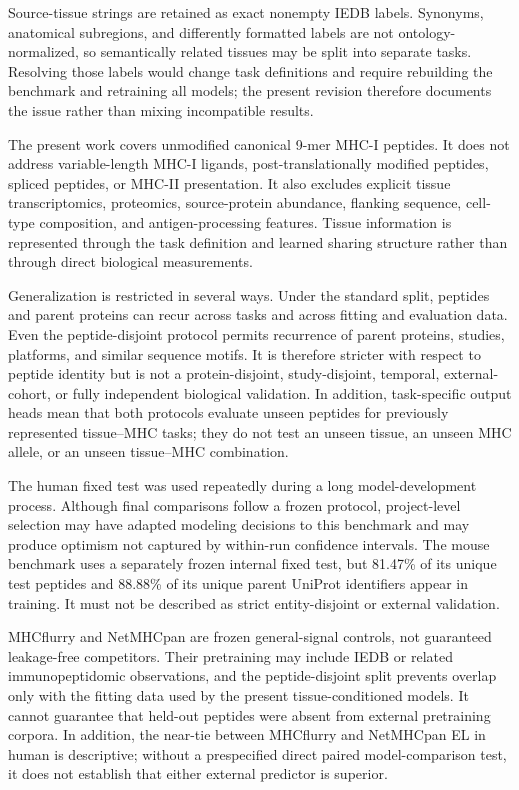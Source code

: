 Source-tissue strings are retained as exact nonempty IEDB labels. Synonyms, anatomical subregions, and differently formatted labels are not ontology-normalized, so semantically related tissues may be split into separate tasks. Resolving those labels would change task definitions and require rebuilding the benchmark and retraining all models; the present revision therefore documents the issue rather than mixing incompatible results.

The present work covers unmodified canonical 9-mer MHC-I peptides. It does not address variable-length MHC-I ligands, post-translationally modified peptides, spliced peptides, or MHC-II presentation. It also excludes explicit tissue transcriptomics, proteomics, source-protein abundance, flanking sequence, cell-type composition, and antigen-processing features. Tissue information is represented through the task definition and learned sharing structure rather than through direct biological measurements.

Generalization is restricted in several ways. Under the standard split, peptides and parent proteins can recur across tasks and across fitting and evaluation data. Even the peptide-disjoint protocol permits recurrence of parent proteins, studies, platforms, and similar sequence motifs. It is therefore stricter with respect to peptide identity but is not a protein-disjoint, study-disjoint, temporal, external-cohort, or fully independent biological validation. In addition, task-specific output heads mean that both protocols evaluate unseen peptides for previously represented tissue--MHC tasks; they do not test an unseen tissue, an unseen MHC allele, or an unseen tissue--MHC combination.

The human fixed test was used repeatedly during a long model-development process. Although final comparisons follow a frozen protocol, project-level selection may have adapted modeling decisions to this benchmark and may produce optimism not captured by within-run confidence intervals. The mouse benchmark uses a separately frozen internal fixed test, but 81.47\% of its unique test peptides and 88.88\% of its unique parent UniProt identifiers appear in training. It must not be described as strict entity-disjoint or external validation.

MHCflurry and NetMHCpan are frozen general-signal controls, not guaranteed leakage-free competitors. Their pretraining may include IEDB or related immunopeptidomic observations, and the peptide-disjoint split prevents overlap only with the fitting data used by the present tissue-conditioned models. It cannot guarantee that held-out peptides were absent from external pretraining corpora. In addition, the near-tie between MHCflurry and NetMHCpan EL in human is descriptive; without a prespecified direct paired model-comparison test, it does not establish that either external predictor is superior.

